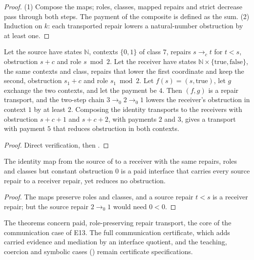 \begin{proof}
(1) Compose the maps; roles, classes, mapped repairs and strict decrease pass through both steps.
The payment of the composite is defined as the sum. (2) Induction on $k$: each transported repair
lowers a natural-number obstruction by at least one.
\end{proof}

\begin{theorem}\label{thm:e13-cross}
Let the source have states $\mathbb N$, contexts $\{0, 1\}$ of class $7$, repairs $s \to_c t$ for
$t < s$, obstruction $s + c$ and role $s \bmod 2$. Let the receiver have states $\mathbb N \times
\{\text{true}, \text{false}\}$, the same contexts and class, repairs that lower the first coordinate
and keep the second, obstruction $s_1 + c$ and role $s_1 \bmod 2$. Let $f(s) = (s, \text{true})$,
let $g$ exchange the two contexts, and let the payment be $4$. Then $(f, g)$ is a repair transport,
and the two-step chain $3 \to_0 2 \to_0 1$ lowers the receiver's obstruction in context $1$ by at
least $2$. Composing the identity transports to the receivers with obstruction $s + c + 1$ and
$s + c + 2$, with payments $2$ and $3$, gives a transport with payment $5$ that reduces obstruction
in both contexts.
\end{theorem}

\begin{proof}
Direct verification, then .
\end{proof}

\begin{proposition}\label{prop:e13-flat}
The identity map from the source of  to a receiver with the same repairs, roles
and classes but constant obstruction $0$ is a paid interface that carries every source repair to a
receiver repair, yet reduces no obstruction.
\end{proposition}

\begin{proof}
The maps preserve roles and classes, and a source repair $t < s$ is a receiver repair; but the source
repair $2 \to_0 1$ would need $0 < 0$.
\end{proof}

The theorems concern paid, role-preserving repair transport, the core of the communication case of
E13. The full communication certificate, which adds carried evidence and mediation by an interface
quotient, and the teaching, coercion and symbolic cases () remain certificate
specifications.
